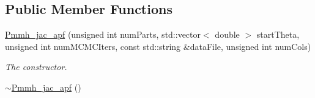 \subsection*{Public Member Functions}
\begin{DoxyCompactItemize}
\item 
\hyperlink{classPmmh__jac__apf_a3efb1ce126a1e5ca5a4b56fa453fd40b}{Pmmh\+\_\+jac\+\_\+apf} (unsigned int num\+Parts, std\+::vector$<$ double $>$ start\+Theta, unsigned int num\+M\+C\+M\+C\+Iters, const std\+::string \&data\+File, unsigned int num\+Cols)
\begin{DoxyCompactList}\small\item\em The constructor. \end{DoxyCompactList}\item 
\hyperlink{classPmmh__jac__apf_afbe2594fe7e40914ac4edc36580ebc33}{$\sim$\+Pmmh\+\_\+jac\+\_\+apf} ()\hypertarget{classPmmh__jac__apf_afbe2594fe7e40914ac4edc36580ebc33}{}\label{classPmmh__jac__apf_afbe2594fe7e40914ac4edc36580ebc33}


\end{DoxyCompactItemize}
